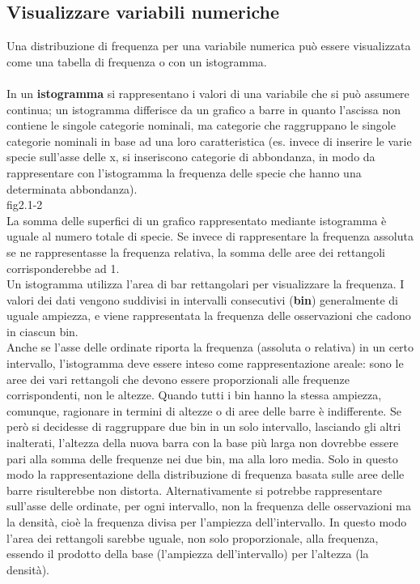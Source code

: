 \documentclass[drafts, 10pt]{book}
\begin{document}
\subsection{Visualizzare variabili numeriche}
Una distribuzione di frequenza per una variabile numerica può essere visualizzata come una tabella di frequenza o con un istogramma.
\\
\\
In un \textbf{istogramma} si rappresentano i valori di una variabile che si può assumere continua; un istogramma differisce da un grafico a barre in quanto l’ascissa non contiene le singole categorie nominali, ma categorie che raggruppano le singole categorie nominali in base ad una loro caratteristica (es. invece di inserire le varie specie sull’asse delle x, si inseriscono categorie di abbondanza, in modo da rappresentare con l’istogramma la frequenza delle specie che hanno una determinata abbondanza). 
\\
fig2.1-2\label{fig2.1-2}
\\
La somma delle superfici di un grafico rappresentato mediante istogramma è uguale al numero totale di specie. Se invece di rappresentare la frequenza assoluta se ne rappresentasse la frequenza relativa, la somma delle aree dei rettangoli corrisponderebbe ad 1.
\\
Un istogramma utilizza l'area di bar rettangolari per visualizzare la frequenza. I valori dei dati vengono suddivisi in intervalli consecutivi (\textbf{bin}) generalmente di uguale ampiezza, e viene rappresentata la frequenza delle osservazioni che cadono in ciascun bin. 
\\
Anche se l'asse delle ordinate riporta la frequenza (assoluta o relativa) in un certo intervallo, l'istogramma deve essere inteso come rappresentazione areale: sono le aree dei vari rettangoli che devono essere proporzionali alle frequenze corrispondenti, non le altezze. Quando tutti i bin hanno la stessa ampiezza, comunque, ragionare in termini di altezze o di aree delle barre è indifferente. Se però si decidesse di raggruppare due bin in un solo intervallo, lasciando gli altri inalterati, l'altezza della nuova barra con la base più larga non dovrebbe essere pari alla somma delle frequenze nei due bin, ma alla loro media. Solo in questo modo la rappresentazione della distribuzione di frequenza basata sulle aree delle barre risulterebbe non distorta. Alternativamente si potrebbe rappresentare sull'asse delle ordinate, per ogni intervallo, non la frequenza delle osservazioni ma la densità, cioè la frequenza divisa per l'ampiezza dell'intervallo. In questo modo l'area dei rettangoli sarebbe uguale, non solo proporzionale, alla frequenza, essendo il prodotto della base (l'ampiezza dell'intervallo) per l'altezza (la densità).
\end{document}
